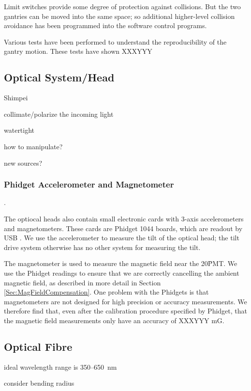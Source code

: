 Limit switches provide some degree of protection against collisions.  But the two gantries can
be moved into the same space; so additional higher-level collision avoidance has been
programmed into the software control programs.



Various tests have been performed to understand the reproducibility of the gantry motion.  These tests have shown
XXXYYY






\subsection{Optical System/Head}

Shimpei

collimate/polarize the incoming light

watertight

how to manipulate?

new sources?


\subsubsection{Phidget Accelerometer and Magnetometer}
\label{Sec:PhidgetAccMag}.

The optiocal heads also contain small electronic cards with 3-axis accelerometers and
magnetometers.  These cards are Phidget 1044 boards, which are readout by USB \cite{PhidgetRef}.
We use the accelerometer to measure the tilt of the optical head; the tilt drive system
otherwise has no other system for measuring the tilt.

The magnetometer is used to measure the magnetic field near the 20\" PMT.  We use the Phidget
readings to ensure that we are correctly cancelling the ambient magnetic field, as described
in more detail in Section \ref{Sec:MagFieldCompensation}.
One problem with the Phidgets is that magnetometers are not designed for high precision or accuracy  measurements.
We therefore find that, even after the calibration procedure specified by Phidget, that the
magnetic field measurements only have an accuracy of XXXYYY mG.


\subsection{Optical Fibre}
ideal wavelength range is 350--650~nm

consider bending radius

